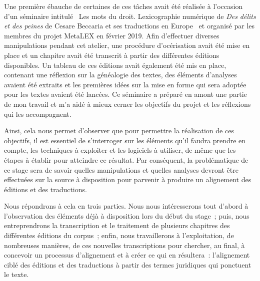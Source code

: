 Une première ébauche de certaines de ces tâches avait été réalisée à l'occasion d'un séminaire intitulé \og~Les mots du droit. Lexicographie numérique de \emph{Des délits et des peines} de Cesare Beccaria et ses traductions en Europe~\fg{} et organisé par les membres du projet MetaLEX en février 2019. Afin d'effectuer diverses manipulations pendant cet atelier, une procédure d'océrisation avait été mise en place et un chapitre avait été transcrit à partir des différentes éditions disponibles. Un tableau de ces éditions avait également été mis en place, contenant une réflexion sur la généalogie des textes, des éléments d'analyses avaient été extraits et les premières idées sur la mise en forme qui sera adoptée pour les textes avaient été lancées. Ce séminaire a préparé en amont une partie de mon travail et m'a aidé à mieux cerner les objectifs du projet et les réflexions qui les accompagnent.

Ainsi, cela nous permet d'observer que pour permettre la réalisation de ces objectifs, il est essentiel de s'interroger sur les éléments qu'il faudra prendre en compte, les techniques à exploiter et les logiciels à utiliser, de même que les étapes à établir pour atteindre ce résultat. Par conséquent, la problématique de ce stage sera de savoir quelles manipulations et quelles analyses devront être effectuées sur la source à disposition pour parvenir à produire un alignement des éditions et des traductions.

Nous répondrons à cela en trois parties. Nous nous intéresserons tout d'abord à l'observation des éléments déjà à disposition lors du début du stage~; puis, nous entreprendrons la transcription et le traitement de plusieurs chapitres des différentes éditions du corpus~; enfin, nous travaillerons à l'exploitation, de nombreuses manières, de ces nouvelles transcriptions pour chercher, au final, à concevoir un processus d'alignement et à créer ce qui en résultera~: l'alignement ciblé des éditions et des traductions à partir des termes juridiques qui ponctuent le texte.